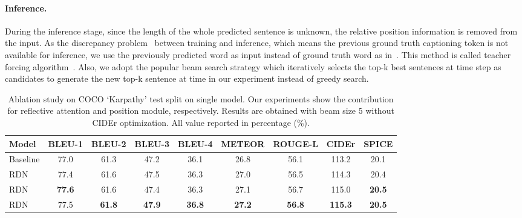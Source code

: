 \documentclass[10pt,twocolumn,letterpaper]{article}
\begin{document}
\paragraph{Inference.} 
During the inference stage, since the length of the whole predicted sentence is unknown, the relative position information is removed from the input.
As the discrepancy problem~\cite{lamb2016professor} between training and inference, which means the previous ground truth captioning token is not available for inference, we use the previously predicted word as input instead of ground truth word as in~\cite{chen2015mind,xu2015showattendtell}.
This method is called teacher forcing algorithm~\cite{williams1989learning}.
Also, we adopt the popular beam search strategy which iteratively selects the top-k best sentences at time step  as candidates to generate the new top-k sentence at time  in our experiment instead of greedy search.
\vspace{-0.02in}

\begin{table*}[t]
	\centering
	\tabcolsep=0.15cm
	\renewcommand{\arraystretch}{0.9}
	{\small
		\begin{tabular}{ l | c c c c c c c c }
			\toprule
			Model & BLEU-1 & BLEU-2  & BLEU-3  & BLEU-4  & METEOR & ROUGE-L & CIDEr & SPICE \\
			\midrule
			Baseline    & 77.0 & 61.3 & 47.2 & 36.1  & 26.8 & 56.1 & 113.2 & 20.1 \\
			RDN   & 77.4 & 61.6 & 47.5 & 36.3  & 27.0 & 56.5 & 114.3 & 20.4 \\
			RDN   & \textbf{77.6} & 61.6 & 47.4 & 36.3  & 27.1 & 56.7 & 115.0 & \textbf{20.5} \\
			RDN   & 77.5 & \textbf{61.8} & \textbf{47.9} & \textbf{36.8} & \textbf{27.2} & \textbf{56.8} & \textbf{115.3} & \textbf{20.5} \\
			\bottomrule
		\end{tabular}
	}
    \vspace{0.1cm}
	\caption {Ablation study on COCO `Karpathy' test split on single model. Our experiments show the contribution for reflective attention and position module, respectively. Results are obtained with beam size 5 without CIDEr optimization. All value reported in percentage (\%).
	}
    \vspace{-0.1in}
	\label{table:ablation_study}
\end{table*}
\end{document}
